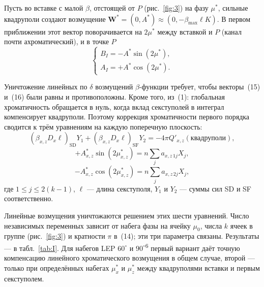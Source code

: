 \documentclass[11pt,a4paper]{article}
\begin{document}
Пусть во вставке с малой $\beta$, отстоящей от $P$ (рис.~\ref{fig:3}) на фазу
$\mu^*$, сильные квадруполи создают возмущение
$\mathbf{W}^*=(0,A^*)\approx(0,-\beta_{\max}\ell K)$. В первом приближении этот
вектор поворачивается на $2\mu^*$ между вставкой и $P$ (канал почти
ахроматический), и в точке $P$
\begin{equation}
\begin{cases}
B_I=-A^*\sin(2\mu^*),\\
A_I=+A^*\cos(2\mu^*).
\end{cases}
\end{equation}

Уничтожение линейных по $\delta$ возмущений $\beta$-функции требует, чтобы
векторы~(15) и~(16) были равны и противоположны. Кроме того, из~(1): глобальная
хроматичность обращается в нуль, когда вклад секступолей в интеграл компенсирует
квадруполи. Поэтому коррекция хроматичности первого порядка сводится к трём
уравнениям на каждую поперечную плоскость:
\begin{equation}
(\beta_{x,z}D_x\ell)_{\mathrm{SD}}Y_1+(\beta_{x,z}D_x\ell)_{\mathrm{SF}}Y_2
=-4\pi Q'_{x,z}(\text{квадруполи}),
\end{equation}
\begin{equation}
+A^*_{x,z}\sin(2\mu^*_{x,z})=n\sum_j a_{x,z\,1j}X_j,
\end{equation}
\begin{equation}
-A^*_{x,z}\cos(2\mu^*_{x,z})=n\sum_j a_{x,z\,2j}X_j,
\end{equation}
где $1\le j\le 2(k-1)$, $\ell$ --- длина секступоля, $Y_1$ и $Y_2$ --- суммы сил
SD и SF соответственно.

Линейные возмущения уничтожаются решением этих шести уравнений. Число
независимых переменных зависит от набега фазы на ячейку $\mu_0$, числа $k$
ячеек в группе (рис.~\ref{fig:3}) и кратности $\pi$ в~(14); эти три параметра
связаны. Результаты --- в табл.~\ref{tab:I}. Для набегов LEP $60^\circ$ и
$90^\circ$\textsuperscript{6} первый вариант даёт точную компенсацию линейного
хроматического возмущения в общем случае, второй --- только при определённых
набегах $\mu_x^*$ и $\mu_z^*$ между квадруполями вставки и первым секступолем.
\end{document}
